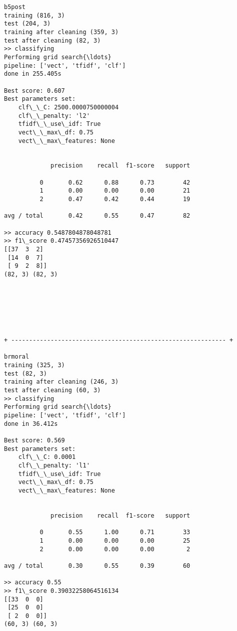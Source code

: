 \documentclass[11pt]{article}
\begin{document}
    \begin{Verbatim}[commandchars=\\\{\}]
b5post
training (816, 3)
test (204, 3)
training after cleaning (359, 3)
test after cleaning (82, 3)
>> classifying
Performing grid search{\ldots}
pipeline: ['vect', 'tfidf', 'clf']
done in 255.405s

Best score: 0.607
Best parameters set:
	clf\_\_C: 2500.0000750000004
	clf\_\_penalty: 'l2'
	tfidf\_\_use\_idf: True
	vect\_\_max\_df: 0.75
	vect\_\_max\_features: None


             precision    recall  f1-score   support

          0       0.62      0.88      0.73        42
          1       0.00      0.00      0.00        21
          2       0.47      0.42      0.44        19

avg / total       0.42      0.55      0.47        82

>> accuracy 0.5487804878048781
>> f1\_score 0.47457356926510447
[[37  3  2]
 [14  0  7]
 [ 9  2  8]]
(82, 3) (82, 3)

    \end{Verbatim}

    \begin{center}
    \end{center}
    { \hspace*{\fill} \\}
    
    \begin{center}
    \end{center}
    { \hspace*{\fill} \\}
    
    \begin{Verbatim}[commandchars=\\\{\}]


+ ------------------------------------------------------------ +

brmoral
training (325, 3)
test (82, 3)
training after cleaning (246, 3)
test after cleaning (60, 3)
>> classifying
Performing grid search{\ldots}
pipeline: ['vect', 'tfidf', 'clf']
done in 36.412s

Best score: 0.569
Best parameters set:
	clf\_\_C: 0.0001
	clf\_\_penalty: 'l1'
	tfidf\_\_use\_idf: True
	vect\_\_max\_df: 0.75
	vect\_\_max\_features: None


             precision    recall  f1-score   support

          0       0.55      1.00      0.71        33
          1       0.00      0.00      0.00        25
          2       0.00      0.00      0.00         2

avg / total       0.30      0.55      0.39        60

>> accuracy 0.55
>> f1\_score 0.39032258064516134
[[33  0  0]
 [25  0  0]
 [ 2  0  0]]
(60, 3) (60, 3)

    \end{Verbatim}
\end{document}
